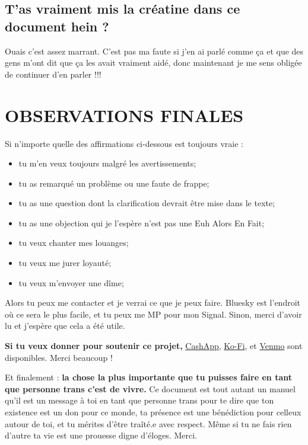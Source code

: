 \documentclass{article}
\begin{document}
\subsection{T'as vraiment mis la créatine dans ce document hein ?}

Ouais c'est assez marrant. C'est pas ma faute si j'en ai parlé comme ça et que des gens m'ont dit que ça les avait vraiment aidé, donc maintenant je me sens obligée de continuer d'en parler !!!

 

\section{OBSERVATIONS FINALES}

Si n'importe quelle des affirmations ci-dessous est toujours vraie :

\begin{itemize}
\item tu m'en veux toujours malgré les avertissements;

\item tu as remarqué un problème ou une faute de frappe;

\item tu as une question dont la clarification devrait être mise dans le texte;

\item tu as une objection qui je l'espère n'est pas une Euh Alors En Fait;

\item tu veux chanter mes louanges;

\item tu veux me jurer loyauté; 

\item tu veux m'envoyer une dîme;
\end{itemize}

Alors tu peux me contacter et je verrai ce que je peux faire. Bluesky est l'endroit où ce sera le plus facile, et tu peux me MP pour mon Signal. Sinon, merci d'avoir lu et j'espère que cela a été utile.

\textbf{Si tu veux donner pour soutenir ce projet,} \href{https://cash.app/Katitties}{CashApp}, \href{https://ko-fi.com/katitties}{Ko-Fi}, et \href{https://account.venmo.com/u/katitties}{Venmo} sont disponibles. Merci beaucoup !

Et finalement : \textbf{la chose la plus importante que tu puisses faire en tant que personne trans c'est de vivre.} Ce document est tout autant un manuel qu'il est un message à toi en tant que personne trans pour te dire que ton existence est un don pour ce monde, ta présence est une bénédiction pour celleux autour de toi, et tu mérites d'être traîté.e avec respect. Même si tu ne fais rien d'autre ta vie est une prouesse digne d'éloges. Merci.
\end{document}
